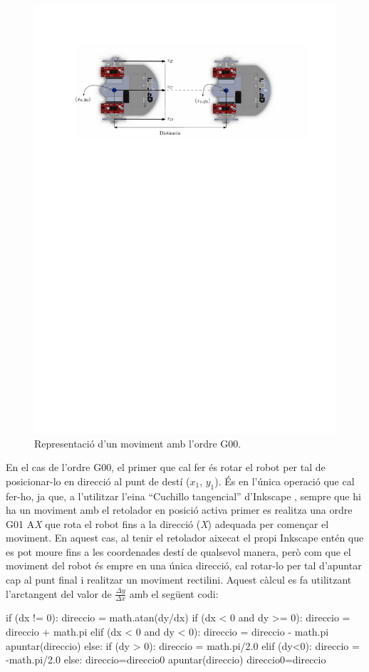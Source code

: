 \begin{figure}[H]
	\centering
	\includegraphics[scale=0.9]{G00}
	\caption{Representació d'un moviment amb l'ordre G00.}
	\label{fig:G00}
\end{figure}


En el cas de l’ordre G00, el primer que cal fer és rotar el robot per tal de posicionar-lo en direcció al punt de destí ($x_{1}$, $y_{1}$). És en l'única operació que cal fer-ho, ja que, a l'utilitzar l’eina “Cuchillo tangencial” d’Inkscape , sempre que hi ha un moviment amb el retolador en posició activa primer es realitza una ordre G01 A\emph{X} que rota el robot fins a la direcció (\emph{X}) adequada per començar el moviment. En aquest cas, al tenir el retolador aixecat el propi Inkscape entén que es pot moure fins a les coordenades destí de qualsevol manera, però com que el moviment del robot és empre en una única direcció, cal rotar-lo per tal d'apuntar cap al punt final i realitzar un moviment rectilini. Aquest càlcul es fa utilitzant l’arctangent del valor de $\frac{\Delta y }{\Delta x}$ amb el següent codi:
\begin{python}
	if (dx != 0):
		direccio = math.atan(dy/dx) 
		if (dx < 0 and dy >= 0):
			direccio = direccio + math.pi 
		elif (dx < 0 and dy < 0):
			direccio = direccio - math.pi
		apuntar(direccio) 
	else:
		if (dy > 0):
			direccio = math.pi/2.0 
		elif (dy<0):
			direccio = -math.pi/2.0 
		else:
			direccio=direccio0
		apuntar(direccio) 
	direccio0=direccio
\end{python}

